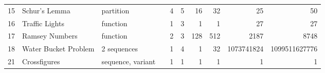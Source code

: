 \begin{sidewaystable}
\begin{center}
\begin{tabular}{r|l|l|l|r|r|r|r|r|r}
 15     &   Schur's Lemma                                                   &   partition                                                                                                 &   \cite{guy2004unsolved}                                               & 4                & 5                & 16                                                   & 32                                    & 25                                                          & 50                                                          \\
 16     &   Traffic Lights                                                  &   function                                                                                                  &   \cite{Hower98Revisiting}                                             & 1                & 3                & 1                                                    & 1                                     & 27                                                          & 27                                                          \\
 17     &   Ramsey Numbers                                                  &   function                                                                                                  &   \cite{gent1999symmetry}                                              & 2                & 3                & 128                                                  & 512                                   & 2187                                                        & 8748                                                        \\
 18     &   Water Bucket Problem                                            &   2 sequences                                                                                               &   \cite{akgun2014_dontcare, azevedo2005prototype}                      & 1                & 4                & 1                                                    & 32                                    & 1073741824                                                  & 1099511627776                                               \\
 21     &   Crossfigures                                                    &   sequence, variant                                                                                         &   \cite{csplib:prob021}                                                & 1                & 1                & 1                                                    & 1                                     & 1                                                           & 1                                                           \\

\end{tabular}
\end{center}
\end{sidewaystable}
